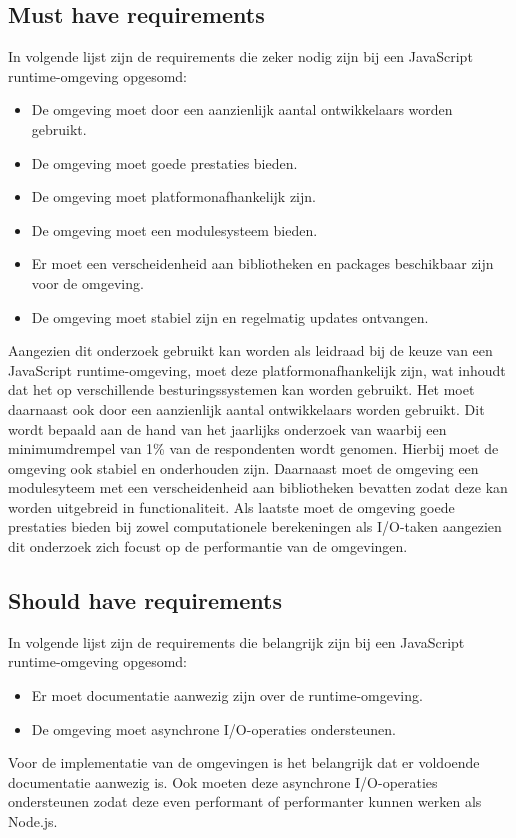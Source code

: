 \subsection{Must have requirements}
In volgende lijst zijn de requirements die zeker nodig zijn bij een JavaScript runtime-omgeving opgesomd:
\begin{itemize}
    \item De omgeving moet door een aanzienlijk aantal ontwikkelaars worden gebruikt.
    \item De omgeving moet goede prestaties bieden.
    \item De omgeving moet platformonafhankelijk zijn.
    \item De omgeving moet een modulesysteem bieden.
    \item Er moet een verscheidenheid aan bibliotheken en packages beschikbaar zijn voor de omgeving.
    \item De omgeving moet stabiel zijn en regelmatig updates ontvangen.
\end{itemize}
Aangezien dit onderzoek gebruikt kan worden als leidraad bij de keuze van een JavaScript runtime-omgeving, 
moet deze platformonafhankelijk zijn, wat inhoudt dat het op verschillende besturingssystemen kan worden gebruikt.
Het moet daarnaast ook door een aanzienlijk aantal ontwikkelaars worden gebruikt.
Dit wordt bepaald aan de hand van het jaarlijks onderzoek van \textcite{Greif2022} 
waarbij een minimumdrempel van 1\% van de respondenten wordt genomen.
Hierbij moet de omgeving ook stabiel en onderhouden zijn.
Daarnaast moet de omgeving een modulesyteem met een verscheidenheid aan bibliotheken bevatten 
zodat deze kan worden uitgebreid in functionaliteit. 
Als laatste moet de omgeving goede prestaties bieden bij zowel computationele berekeningen als I/O-taken
aangezien dit onderzoek zich focust op de performantie van de omgevingen.

\subsection{Should have requirements}
In volgende lijst zijn de requirements die belangrijk zijn bij een JavaScript runtime-omgeving opgesomd:
\begin{itemize}
    \item Er moet documentatie aanwezig zijn over de runtime-omgeving.
    \item De omgeving moet asynchrone I/O-operaties ondersteunen.
\end{itemize}
Voor de implementatie van de omgevingen is het belangrijk dat er voldoende documentatie aanwezig is.
Ook moeten deze asynchrone I/O-operaties ondersteunen zodat deze even performant of performanter kunnen werken als Node.js.

